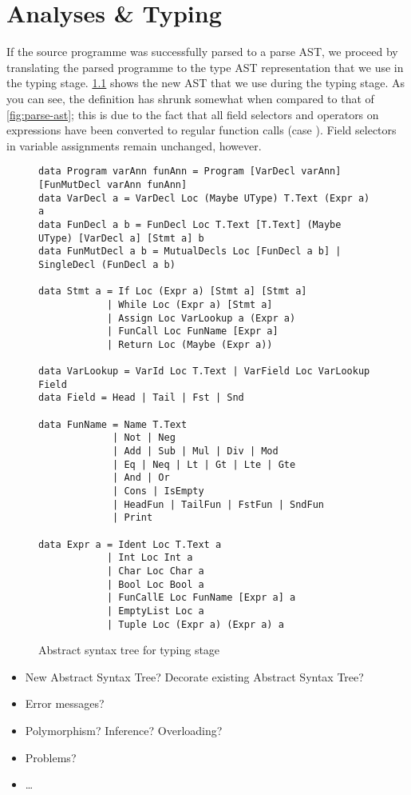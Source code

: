 \chapter{Analyses \& Typing}

If the source programme was successfully parsed to a parse AST, we proceed by
translating the parsed programme to the type AST representation that we use in
the typing stage.
\cref{fig:type-ast} shows the new AST that we use during the typing stage.
As you can see, the definition has shrunk somewhat when compared to that of
\cref{fig:parse-ast}; this is due to the fact that all field selectors and
operators on expressions have been converted to regular function calls
(case ).
Field selectors in variable assignments remain unchanged, however.


\begin{figure}
\begin{verbatim}
data Program varAnn funAnn = Program [VarDecl varAnn] [FunMutDecl varAnn funAnn]
data VarDecl a = VarDecl Loc (Maybe UType) T.Text (Expr a) a
data FunDecl a b = FunDecl Loc T.Text [T.Text] (Maybe UType) [VarDecl a] [Stmt a] b
data FunMutDecl a b = MutualDecls Loc [FunDecl a b] | SingleDecl (FunDecl a b)

data Stmt a = If Loc (Expr a) [Stmt a] [Stmt a]
            | While Loc (Expr a) [Stmt a]
            | Assign Loc VarLookup a (Expr a)
            | FunCall Loc FunName [Expr a]
            | Return Loc (Maybe (Expr a))

data VarLookup = VarId Loc T.Text | VarField Loc VarLookup Field
data Field = Head | Tail | Fst | Snd

data FunName = Name T.Text
             | Not | Neg
             | Add | Sub | Mul | Div | Mod
             | Eq | Neq | Lt | Gt | Lte | Gte
             | And | Or
             | Cons | IsEmpty
             | HeadFun | TailFun | FstFun | SndFun
             | Print

data Expr a = Ident Loc T.Text a
            | Int Loc Int a
            | Char Loc Char a
            | Bool Loc Bool a
            | FunCallE Loc FunName [Expr a] a
            | EmptyList Loc a
            | Tuple Loc (Expr a) (Expr a) a
\end{verbatim}

\caption{Abstract syntax tree for typing stage}
\label{fig:type-ast}
\end{figure}


\begin{itemize}
	\item New Abstract Syntax Tree? Decorate existing Abstract Syntax Tree?
	\item Error messages?
	\item Polymorphism? Inference? Overloading?
	\item Problems?
	\item\ldots
\end{itemize}
